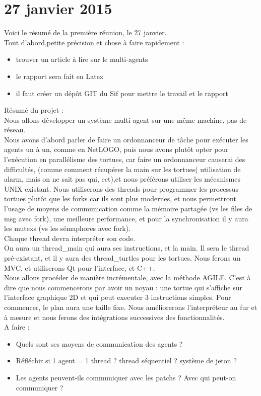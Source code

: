\section{27 janvier 2015}

Voici le résumé de la première réunion, le 27 janvier.\\
Tout d'abord,petite précision et chose à faire rapidement :
\begin{itemize}
\item  trouver un article à lire sur le multi-agents
\item le rapport sera fait en Latex
\item il faut créer un dépôt GIT du Sif pour mettre le travail et le rapport
\end{itemize}

Résumé du projet :\\
Nous allons développer un système multi-agent sur une même machine, pas de réseau.\\
Nous avons d'abord parler de faire un ordonnanceur de tâche pour exécuter les agents un à un, comme en NetLOGO, puis nous avons plutôt opter pour l’exécution en parallélisme des tortues, car faire un ordonnanceur causerai des difficultés, (comme comment récupérer la main sur les tortues( utilisation de alarm, mais on ne sait pas qui, ect),et nous préférons utiliser les mécanismes UNIX existant.
Nous utiliserons des threads pour programmer les processus tortues plutôt que les forks car ils sont plus modernes, et nous permettront l'usage de moyens de communication comme la mémoire partagée (vs les files de msg avec fork), une meilleure performance, et pour la synchronisation il y aura les mutexs (vs les sémaphores avec fork).\\
Chaque thread devra interpréter son code.\\
On aura un thread\_main qui aura ses instructions, et la main. Il sera le thread pré-existant, et il y aura des thread\_turtles pour les tortues.
Nous ferons un MVC, et utiliserons Qt pour l'interface, et C++.\\
Nous allons procéder de manière incrémentale, avec la méthode AGILE. C'est à dire que nous commencerons par avoir un noyau : une tortue qui s'affiche sur l'interface graphique 2D et qui peut executer 3 instructions simples. Pour commencer, le plan aura une taille fixe. Nous améliorerons l'interpréteur au fur et à mesure et nous ferons des intégrations successives des fonctionnalités.\\

A faire :
\begin{itemize}
\item Quels sont ses moyens de communication des agents ?
\item Réfléchir si 1 agent = 1 thread ? thread séquentiel ? système de jeton ?
\item Les agents peuvent-ils communiquer avec les patchs ? Avec qui peut-on communiquer ?
\end{itemize}

